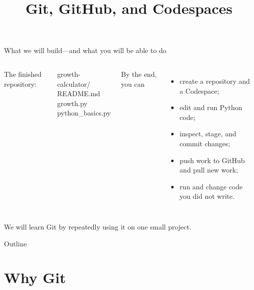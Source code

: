 \documentclass[aspectratio=169,11pt]{beamer}
\title{Git, GitHub, and Codespaces}
\date{}
\begin{document}
\titleslide

\begin{frame}{What we will build---and what you will be able to do}
\begin{columns}[T,onlytextwidth]
  The finished repository:
  \vspace{0.5em}

  \ttfamily
  growth-calculator/\\
  \quad README.md\\
  \quad growth.py\\
  \quad python\_basics.py
  \rmfamily

  By the end, you can
  \begin{itemize}
    \item create a repository and a Codespace;
    \item edit and run Python code;
    \item inspect, stage, and commit changes;
    \item push work to GitHub and pull new work;
    \item run and change code you did not write.
  \end{itemize}
\end{columns}

\vspace{0.9em}
We will learn Git by repeatedly using it on one small project.
\end{frame}

\begin{frame}{Outline}
  \tableofcontents
\end{frame}

\section{Why Git}
\end{document}
